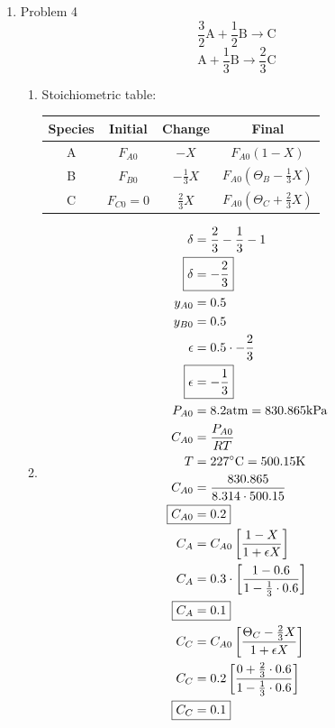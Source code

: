 \documentclass[12pt]{article}
\begin{document}
\begin{enumerate}
\newpage
    \item Problem 4
    \begin{equation*}
        \frac{3}{2} \mathrm{A} + \frac{1}{2} \mathrm{B} \rightarrow \mathrm{C}
    \end{equation*}
    \begin{equation*}
        \mathrm{A} + \frac{1}{3} \mathrm{B} \rightarrow \frac{2}{3} \mathrm{C}
    \end{equation*}
    \begin{enumerate}
        \item Stoichiometric table:
    
        \begin{tabular}{c c c c}
            \hline
            Species & Initial & Change & Final \\
            \hline
            A & $F_{A0}$ & $-X$ & $F_{A0} (1 - X) $ \\
            B & $F_{B0}$ & $- \frac{1}{3} X$ & $F_{A0} (\Theta_{B} - \frac{1}{3} X) $ \\
            C & $F_{C0}=0$ & $\frac{2}{3} X$ & $F_{A0} (\Theta_{C} + \frac{2}{3} X) $ \\
            \hline
        \end{tabular}

        \item
        \begin{align*}
            \delta &= \frac{2}{3} - \frac{1}{3} - 1 \\
            \Aboxed{\delta &= -\frac{2}{3}} \\
            y_{A0} &= 0.5 \\
            y_{B0} &= 0.5 \\
            \epsilon &= 0.5 \cdot -\frac{2}{3}  \\
            \Aboxed{\epsilon &= -\frac{1}{3}}  \\
            P_{A0} &= 8.2 \mathrm{atm} = 830.865 \mathrm{kPa} \\
            C_{A0} &= \frac{P_{A0}}{RT} \\
            T &= 227 ^\circ\mathrm{C} = 500.15 \mathrm{K} \\
            C_{A0} &= \frac{830.865}{8.314 \cdot 500.15} \\
            \Aboxed{C_{A0} &= 0.2} \\
            C_A &= C_{A0} \left[ \frac{1 - X}{1 + \epsilon X} \right] \\
            C_A &= 0.3 \cdot \left[ \frac{1 - 0.6}{1 - \frac{1}{3} \cdot 0.6} \right] \\
            \Aboxed{C_A &= 0.1} \\
            C_C &= C_{A0} \left[ \frac{\Theta_C - \frac{2}{3} X}{1 + \epsilon X} \right] \\
            C_C &= 0.2 \left[ \frac{0 + \frac{2}{3} \cdot 0.6}{1 - \frac{1}{3} \cdot 0.6} \right] \\
            \Aboxed{C_C &= 0.1}
        \end{align*}


\end{enumerate}
\end{enumerate}
\end{document}
